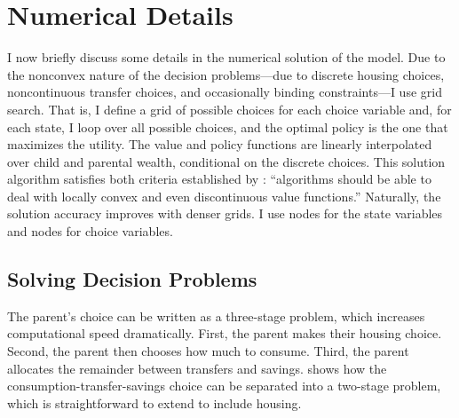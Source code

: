 \documentclass[12pt]{article}
\begin{document}
\begin{table}
	\center 
\end{table}

\section{Numerical Details}\label{sec:computational}
I now briefly discuss some details in the numerical solution of the model. Due to the nonconvex nature of the decision problems---due to discrete housing choices, noncontinuous transfer choices, and occasionally binding constraints---I use grid search. That is, I define a grid of possible choices for each choice variable and, for each state, I loop over all possible choices, and the optimal policy is the one that maximizes the utility. The value and policy functions are linearly interpolated over child and parental wealth, conditional on the discrete choices. This solution algorithm satisfies both criteria established by \cite[p.30]{Barczyk2020}: ``algorithms should be able to deal with locally convex and even discontinuous value functions.'' Naturally, the solution accuracy improves with denser grids. I use {\parnstate} nodes for the state variables and {\parnchoice} nodes for choice variables.

\subsection{Solving Decision Problems} 
The parent's choice can be written as a three-stage problem, which increases computational speed dramatically. First, the parent makes their housing choice. Second, the parent then chooses how much to consume. Third, the parent allocates the remainder between transfers and savings. \cite{Chu2020} shows how the consumption-transfer-savings choice can be separated into a two-stage problem, which is straightforward to extend to include housing.
\end{document}
